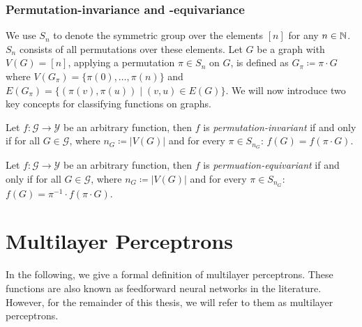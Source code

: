 \subsubsection{Permutation-invariance and -equivariance}
We use $S_n$ to denote the symmetric group over the elements $[n]$ for any $n \in \mathbb{N}$. $S_n$ consists of all permutations over these elements. Let $G$ be a graph with $V(G) = [n]$, applying a permutation $\pi \in S_n$ on $G$, is defined as $G_\pi \coloneqq \pi \cdot G$ where $V(G_\pi) = \{\pi(0), \ldots, \pi(n) \}$ and $E(G_\pi) = \{ (\pi(v), \pi(u)) \mid (v,u) \in E(G)\}$. We will now introduce two key concepts for classifying functions on graphs.

\begin{definition}
    Let $f: \mathcal{G} \rightarrow \mathcal{Y}$ be an arbitrary function, then $f$ is \textit{permutation-invariant} if and only if for all $G \in \mathcal{G}$, where $n_G \coloneqq |V(G)|$ and for every $\pi \in S_{n_G}$: $f(G) = f(\pi \cdot G)$.
\end{definition}

\begin{definition}
    Let $f: \mathcal{G} \rightarrow \mathcal{Y}$ be an arbitrary function, then $f$ is \textit{permuation-equivariant} if and only if for all $G \in \mathcal{G}$, where $n_G \coloneqq |V(G)|$ and for every $\pi \in S_{n_G}$: $f(G) = \pi^{-1} \cdot f(\pi \cdot G)$.
\end{definition}

\section{Multilayer Perceptrons}
In the following, we give a formal definition of multilayer perceptrons. These functions are also known as feedforward neural networks in the literature. However, for the remainder of this thesis, we will refer to them as multilayer perceptrons.

